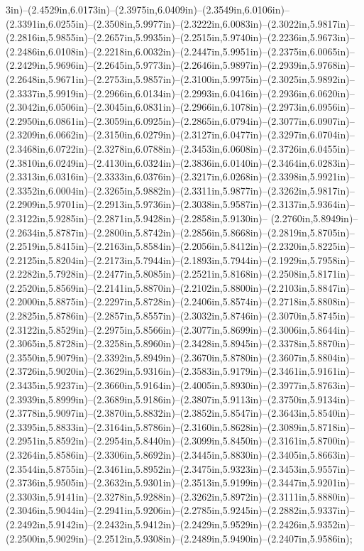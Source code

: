 3in)--(2.4529in,6.0173in)--(2.3975in,6.0409in)--(2.3549in,6.0106in)--(2.3391in,6.0255in)--(2.3508in,5.9977in)--(2.3222in,6.0083in)--(2.3022in,5.9817in)--(2.2816in,5.9855in)--(2.2657in,5.9935in)--(2.2515in,5.9740in)--(2.2236in,5.9673in)--(2.2486in,6.0108in)--(2.2218in,6.0032in)--(2.2447in,5.9951in)--(2.2375in,6.0065in)--(2.2429in,5.9696in)--(2.2645in,5.9773in)--(2.2646in,5.9897in)--(2.2939in,5.9768in)--(2.2648in,5.9671in)--(2.2753in,5.9857in)--(2.3100in,5.9975in)--(2.3025in,5.9892in)--(2.3337in,5.9919in)--(2.2966in,6.0134in)--(2.2993in,6.0416in)--(2.2936in,6.0620in)--(2.3042in,6.0506in)--(2.3045in,6.0831in)--(2.2966in,6.1078in)--(2.2973in,6.0956in)--(2.2950in,6.0861in)--(2.3059in,6.0925in)--(2.2865in,6.0794in)--(2.3077in,6.0907in)--(2.3209in,6.0662in)--(2.3150in,6.0279in)--(2.3127in,6.0477in)--(2.3297in,6.0704in)--(2.3468in,6.0722in)--(2.3278in,6.0788in)--(2.3453in,6.0608in)--(2.3726in,6.0455in)--(2.3810in,6.0249in)--(2.4130in,6.0324in)--(2.3836in,6.0140in)--(2.3464in,6.0283in)--(2.3313in,6.0316in)--(2.3333in,6.0376in)--(2.3217in,6.0268in)--(2.3398in,5.9921in)--(2.3352in,6.0004in)--(2.3265in,5.9882in)--(2.3311in,5.9877in)--(2.3262in,5.9817in)--(2.2909in,5.9701in)--(2.2913in,5.9736in)--(2.3038in,5.9587in)--(2.3137in,5.9364in)--(2.3122in,5.9285in)--(2.2871in,5.9428in)--(2.2858in,5.9130in)--
(2.2760in,5.8949in)--(2.2634in,5.8787in)--(2.2800in,5.8742in)--(2.2856in,5.8668in)--(2.2819in,5.8705in)--(2.2519in,5.8415in)--(2.2163in,5.8584in)--(2.2056in,5.8412in)--(2.2320in,5.8225in)--(2.2125in,5.8204in)--(2.2173in,5.7944in)--(2.1893in,5.7944in)--(2.1929in,5.7958in)--(2.2282in,5.7928in)--(2.2477in,5.8085in)--(2.2521in,5.8168in)--(2.2508in,5.8171in)--(2.2520in,5.8569in)--(2.2141in,5.8870in)--(2.2102in,5.8800in)--(2.2103in,5.8847in)--(2.2000in,5.8875in)--(2.2297in,5.8728in)--(2.2406in,5.8574in)--(2.2718in,5.8808in)--(2.2825in,5.8786in)--(2.2857in,5.8557in)--(2.3032in,5.8746in)--(2.3070in,5.8745in)--(2.3122in,5.8529in)--(2.2975in,5.8566in)--(2.3077in,5.8699in)--(2.3006in,5.8644in)--(2.3065in,5.8728in)--(2.3258in,5.8960in)--(2.3428in,5.8945in)--(2.3378in,5.8870in)--(2.3550in,5.9079in)--(2.3392in,5.8949in)--(2.3670in,5.8780in)--(2.3607in,5.8804in)--(2.3726in,5.9020in)--(2.3629in,5.9316in)--(2.3583in,5.9179in)--(2.3461in,5.9161in)--(2.3435in,5.9237in)--(2.3660in,5.9164in)--(2.4005in,5.8930in)--(2.3977in,5.8763in)--(2.3939in,5.8999in)--(2.3689in,5.9186in)--(2.3807in,5.9113in)--(2.3750in,5.9134in)--(2.3778in,5.9097in)--(2.3870in,5.8832in)--(2.3852in,5.8547in)--(2.3643in,5.8540in)--(2.3395in,5.8833in)--(2.3164in,5.8786in)--(2.3160in,5.8628in)--(2.3089in,5.8718in)--(2.2951in,5.8592in)--(2.2954in,5.8440in)--(2.3099in,5.8450in)--(2.3161in,5.8700in)--(2.3264in,5.8586in)--(2.3306in,5.8692in)--(2.3445in,5.8830in)--(2.3405in,5.8663in)--(2.3544in,5.8755in)--(2.3461in,5.8952in)--(2.3475in,5.9323in)--(2.3453in,5.9557in)--(2.3736in,5.9505in)--(2.3632in,5.9301in)--(2.3513in,5.9199in)--(2.3447in,5.9201in)--(2.3303in,5.9141in)--(2.3278in,5.9288in)--(2.3262in,5.8972in)--(2.3111in,5.8880in)--(2.3046in,5.9044in)--(2.2941in,5.9206in)--(2.2785in,5.9245in)--(2.2882in,5.9337in)--(2.2492in,5.9142in)--(2.2432in,5.9412in)--(2.2429in,5.9529in)--(2.2426in,5.9352in)--(2.2500in,5.9029in)--(2.2512in,5.9308in)--(2.2489in,5.9490in)--(2.2407in,5.9586in);

